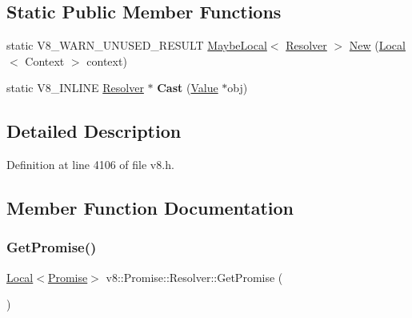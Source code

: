 \subsection*{Static Public Member Functions}
\begin{DoxyCompactItemize}
\item 
static V8\+\_\+\+W\+A\+R\+N\+\_\+\+U\+N\+U\+S\+E\+D\+\_\+\+R\+E\+S\+U\+LT \mbox{\hyperlink{classv8_1_1MaybeLocal}{Maybe\+Local}}$<$ \mbox{\hyperlink{classv8_1_1Promise_1_1Resolver}{Resolver}} $>$ \mbox{\hyperlink{classv8_1_1Promise_1_1Resolver_af2290c10e43fcde230ea7a79b9128b0e}{New}} (\mbox{\hyperlink{classv8_1_1Local}{Local}}$<$ Context $>$ context)
\item 
\mbox{\label{classv8_1_1Promise_1_1Resolver_ab2b541cb210158ed0c757c8b7dc46279}} 
static V8\+\_\+\+I\+N\+L\+I\+NE \mbox{\hyperlink{classv8_1_1Promise_1_1Resolver}{Resolver}} $\ast$ {\bfseries Cast} (\mbox{\hyperlink{classv8_1_1Value}{Value}} $\ast$obj)
\end{DoxyCompactItemize}


\subsection{Detailed Description}


Definition at line 4106 of file v8.\+h.



\subsection{Member Function Documentation}
\mbox{\label{classv8_1_1Promise_1_1Resolver_a41fd1ffef546a62e363a639935fc8ae3}} 
\subsubsection{\texorpdfstring{Get\+Promise()}{GetPromise()}}
{\footnotesize\ttfamily \mbox{\hyperlink{classv8_1_1Local}{Local}}$<$\mbox{\hyperlink{classv8_1_1Promise}{Promise}}$>$ v8\+::\+Promise\+::\+Resolver\+::\+Get\+Promise (\begin{DoxyParamCaption}{ }\end{DoxyParamCaption})}

